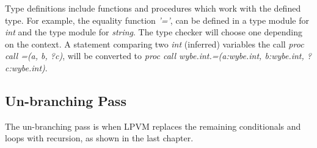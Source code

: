 Type definitions include functions and procedures which work with the defined
type. For example, the equality function \textit{'='}, can be defined in a type
module for \textit{int} and the type module for \textit{string}. The type
checker will choose one depending on the context. A statement comparing two
\textit{int} (inferred) variables the call \textit{proc call =(a, b, ?c)}, will
be converted to \textit{proc call wybe.int.=(a:wybe.int, b:wybe.int,
  ?c:wybe.int)}. 


\subsection{Un-branching Pass}

The un-branching pass is when LPVM replaces the remaining conditionals and
loops with recursion, as shown in the last chapter. 


